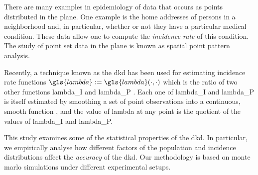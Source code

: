 There are many examples in epidemiology of data that occurs as points distributed in the plane.
One example is
the home addresses of persons in a neighborhood and,
in particular, whether or not they have a particular medical condition.
These data allow one to compute the \textit{\gls{incidence rate}} of this condition.
The study of point set data in the plane is known as spatial point pattern analysis.

Recently, a technique known as the \gls{dkd} has been used for estimating \gls{incidence rate} functions
$\gls{lambda} := \gls{lambda}\dotdot$
which is the ratio of two other functions \gls{lambda_I} and \gls{lambda_P} \citep{portnov2009studying,kloog2009using,zusman2012residential}.
Each one of \gls{lambda_I} and \gls{lambda_P} is itself estimated by smoothing a set of point observations into a continuous,
smooth function \citep{bithell1990application},
and the value of \gls{lambda} at any point is the quotient of the values of \gls{lambda_I} and \gls{lambda_P}.

This study examines some of the statistical properties of the \gls{dkd}.
In particular,
we empirically analyse how different factors of the population and incidence distributions
affect the \textit{accuracy} of the \gls{dkd}.
Our methodology is based on monte marlo simulations under different experimental setups.




